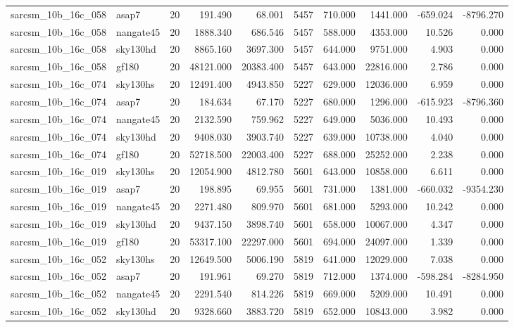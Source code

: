 \documentclass{article}
\begin{document}
\begin{longtable}{llrrrrrrrr}
sarcsm\_10b\_16c\_058 & asap7 & 20 & 191.490 & 68.001 & 5457 & 710.000 & 1441.000 & -659.024 & -8796.270 \\
sarcsm\_10b\_16c\_058 & nangate45 & 20 & 1888.340 & 686.546 & 5457 & 588.000 & 4353.000 & 10.526 & 0.000 \\
sarcsm\_10b\_16c\_058 & sky130hd & 20 & 8865.160 & 3697.300 & 5457 & 644.000 & 9751.000 & 4.903 & 0.000 \\
sarcsm\_10b\_16c\_058 & gf180 & 20 & 48121.000 & 20383.400 & 5457 & 643.000 & 22816.000 & 2.786 & 0.000 \\
sarcsm\_10b\_16c\_074 & sky130hs & 20 & 12491.400 & 4943.850 & 5227 & 629.000 & 12036.000 & 6.959 & 0.000 \\
sarcsm\_10b\_16c\_074 & asap7 & 20 & 184.634 & 67.170 & 5227 & 680.000 & 1296.000 & -615.923 & -8796.360 \\
sarcsm\_10b\_16c\_074 & nangate45 & 20 & 2132.590 & 759.962 & 5227 & 649.000 & 5036.000 & 10.493 & 0.000 \\
sarcsm\_10b\_16c\_074 & sky130hd & 20 & 9408.030 & 3903.740 & 5227 & 639.000 & 10738.000 & 4.040 & 0.000 \\
sarcsm\_10b\_16c\_074 & gf180 & 20 & 52718.500 & 22003.400 & 5227 & 688.000 & 25252.000 & 2.238 & 0.000 \\
sarcsm\_10b\_16c\_019 & sky130hs & 20 & 12054.900 & 4812.780 & 5601 & 643.000 & 10858.000 & 6.611 & 0.000 \\
sarcsm\_10b\_16c\_019 & asap7 & 20 & 198.895 & 69.955 & 5601 & 731.000 & 1381.000 & -660.032 & -9354.230 \\
sarcsm\_10b\_16c\_019 & nangate45 & 20 & 2271.480 & 809.970 & 5601 & 681.000 & 5293.000 & 10.242 & 0.000 \\
sarcsm\_10b\_16c\_019 & sky130hd & 20 & 9437.150 & 3898.740 & 5601 & 658.000 & 10067.000 & 4.347 & 0.000 \\
sarcsm\_10b\_16c\_019 & gf180 & 20 & 53317.100 & 22297.000 & 5601 & 694.000 & 24097.000 & 1.339 & 0.000 \\
sarcsm\_10b\_16c\_052 & sky130hs & 20 & 12649.500 & 5006.190 & 5819 & 641.000 & 12029.000 & 7.038 & 0.000 \\
sarcsm\_10b\_16c\_052 & asap7 & 20 & 191.961 & 69.270 & 5819 & 712.000 & 1374.000 & -598.284 & -8284.950 \\
sarcsm\_10b\_16c\_052 & nangate45 & 20 & 2291.540 & 814.226 & 5819 & 669.000 & 5209.000 & 10.491 & 0.000 \\
sarcsm\_10b\_16c\_052 & sky130hd & 20 & 9328.660 & 3883.720 & 5819 & 652.000 & 10843.000 & 3.982 & 0.000 \\

\end{longtable}
\end{document}
